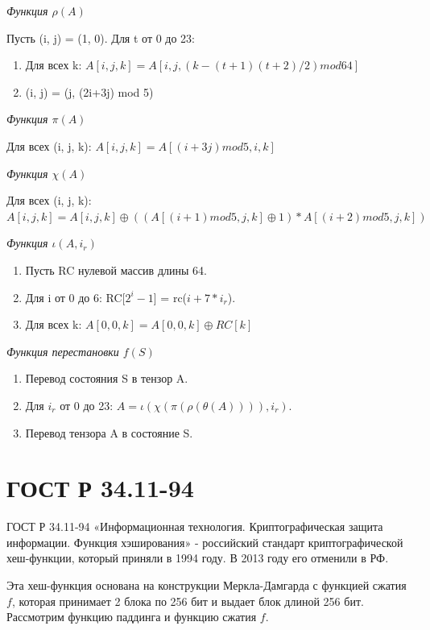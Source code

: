 \documentclass[colorthm]{./civarticle}
\begin{document}
\textit{Функция $\rho(A)$}

Пусть (i, j) = (1, 0). Для t от 0 до 23:

\begin{enumerate}
    \item Для всех k: $A[i, j , k] = A[i, j , (k - (t+1)(t+2)/2) mod 64]$
    \item (i, j) = (j, (2i+3j) mod 5)
\end{enumerate}

\textit{Функция $\pi(A)$}

Для всех (i, j, k): $A[i,j,k] = A[(i+3j) mod 5, i, k]$


\textit{Функция $\chi(A)$}

Для всех (i, j, k): $A[i,j,k] = A[i,j,k] \oplus ((A[(i+1) mod 5, j, k] \oplus 1) * A[(i+2) mod 5, j, k])$

\textit{Функция $\iota(A, i_r)$}

\begin{enumerate}
    \item Пусть RC нулевой массив длины 64.
    \item Для i от 0 до 6: RC[$2^i-1$] = rc($i+7*i_r$).
    \item Для всех k: $A[0,0,k] = A[0,0,k] \oplus RC[k]$
\end{enumerate}

\textit{Функция перестановки $f(S)$}


\begin{enumerate}
    \item Перевод состояния S в тензор A.
    \item Для $i_r$ от 0 до 23: $A = \iota(\chi(\pi(\rho(\theta(A)))), i_r)$.
    \item Перевод тензора A в состояние S.
\end{enumerate}

\section{ГОСТ Р 34.11-94}
ГОСТ Р 34.11-94 «Информационная технология. Криптографическая защита информации. Функция хэширования» - российский стандарт криптографической хеш-функции, который приняли в 1994 году. В 2013 году его отменили в РФ.


Эта хеш-функция основана на конструкции Меркла-Дамгарда с функцией сжатия $f$, которая принимает 2 блока по 256 бит и выдает блок длиной 256 бит. Рассмотрим функцию паддинга и функцию сжатия $f$.
\end{document}
